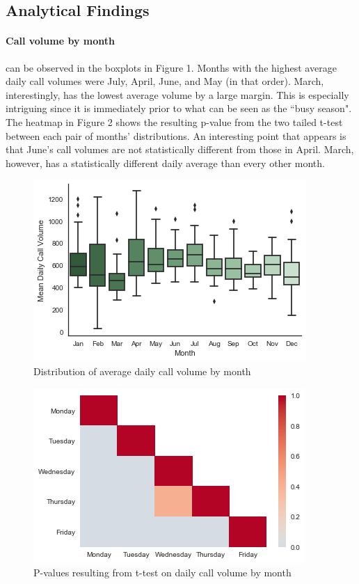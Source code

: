 \documentclass[12pt]{article}
\begin{document}
	\subsection{Analytical Findings}

\paragraph{Call volume by month} can be observed in the boxplots in Figure 1.  Months with the highest average daily call volumes were July, April, June, and May (in that order).  March, interestingly, has the lowest average volume by a large margin.  This is especially intriguing since it is immediately prior to what can be seen as the “busy season".  The heatmap in Figure 2 shows the resulting p-value from the two tailed t-test between each pair of months' distributions.  An interesting point that appears is that June's call volumes are not statistically different from those in April.  March, however, has a statistically different daily average than every other month.


	\begin{figure}
	\includegraphics[scale=.4]{monthly_boxplot.png}
	\caption{Distribution of average daily call volume by month}
	\end{figure}

	\begin{figure}
	\includegraphics[scale=.4]{Daily_Heatmap.png}
	\caption{P-values resulting from t-test on daily call volume by month}
	\end{figure}
\end{document}
